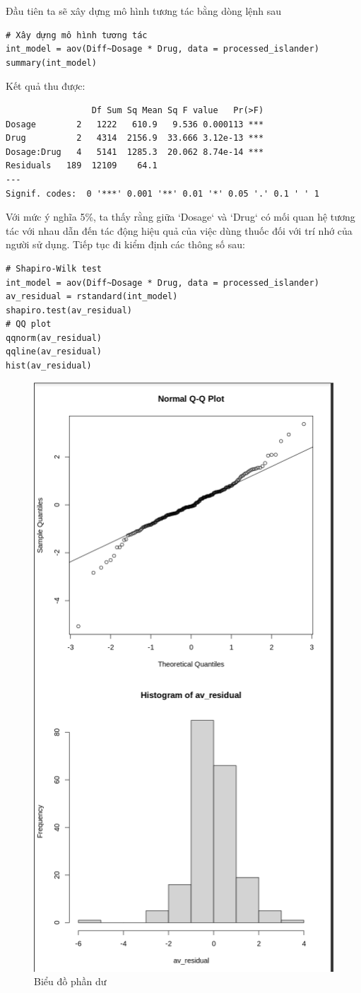 Đầu tiên ta sẽ xây dựng mô hình tương tác bằng dòng lệnh sau
\begin{lstlisting}
# Xây dựng mô hình tương tác
int_model = aov(Diff~Dosage * Drug, data = processed_islander)
summary(int_model)
\end{lstlisting}

Kết quả thu được:

\begin{lstlisting}
                 Df Sum Sq Mean Sq F value   Pr(>F)    
Dosage        2   1222   610.9   9.536 0.000113 ***
Drug          2   4314  2156.9  33.666 3.12e-13 ***
Dosage:Drug   4   5141  1285.3  20.062 8.74e-14 ***
Residuals   189  12109    64.1                     
---
Signif. codes:  0 '***' 0.001 '**' 0.01 '*' 0.05 '.' 0.1 ' ' 1
\end{lstlisting}
Với mức ý nghĩa 5\%, ta thấy rằng giữa `Dosage` và `Drug` có mối quan hệ tương tác với nhau dẫn đến tác động hiệu quả của việc dùng thuốc đối với trí nhớ của người sử dụng. Tiếp tục đi kiểm định các thông số sau:

\begin{lstlisting}
# Shapiro-Wilk test
int_model = aov(Diff~Dosage * Drug, data = processed_islander)
av_residual = rstandard(int_model)
shapiro.test(av_residual)
# QQ plot
qqnorm(av_residual)
qqline(av_residual)
hist(av_residual)
\end{lstlisting}

\begin{figure}[H]
    \centering
    \includegraphics[width=0.45\linewidth]{part01_figures/6.png}
    \caption{Biểu đồ phần dư}
    \label{fig:Biểu đồ phần dư}
\end{figure}

